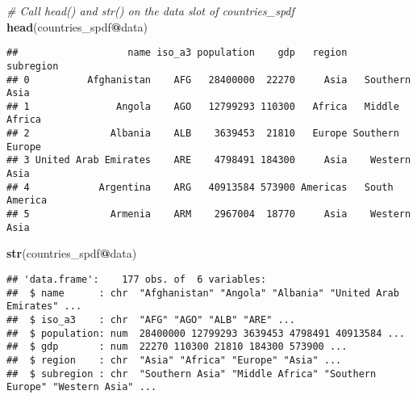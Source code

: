 \documentclass[]{article}
\newenvironment{Shaded}{\begin{snugshade}}{\end{snugshade}}
\newcommand{\CommentTok}[1]{\textcolor[rgb]{0.56,0.35,0.01}{\textit{#1}}}
\newcommand{\KeywordTok}[1]{\textcolor[rgb]{0.13,0.29,0.53}{\textbf{#1}}}
\newcommand{\NormalTok}[1]{#1}
\newcommand{\OperatorTok}[1]{\textcolor[rgb]{0.81,0.36,0.00}{\textbf{#1}}}
\begin{document}
\begin{Shaded}
\begin{Highlighting}[]
\CommentTok{# Call head() and str() on the data slot of countries_spdf}
\KeywordTok{head}\NormalTok{(countries_spdf}\OperatorTok{@}\NormalTok{data)}
\end{Highlighting}
\end{Shaded}

\begin{verbatim}
##                   name iso_a3 population    gdp   region       subregion
## 0          Afghanistan    AFG   28400000  22270     Asia   Southern Asia
## 1               Angola    AGO   12799293 110300   Africa   Middle Africa
## 2              Albania    ALB    3639453  21810   Europe Southern Europe
## 3 United Arab Emirates    ARE    4798491 184300     Asia    Western Asia
## 4            Argentina    ARG   40913584 573900 Americas   South America
## 5              Armenia    ARM    2967004  18770     Asia    Western Asia
\end{verbatim}

\begin{Shaded}
\begin{Highlighting}[]
\KeywordTok{str}\NormalTok{(countries_spdf}\OperatorTok{@}\NormalTok{data)}
\end{Highlighting}
\end{Shaded}

\begin{verbatim}
## 'data.frame':    177 obs. of  6 variables:
##  $ name      : chr  "Afghanistan" "Angola" "Albania" "United Arab Emirates" ...
##  $ iso_a3    : chr  "AFG" "AGO" "ALB" "ARE" ...
##  $ population: num  28400000 12799293 3639453 4798491 40913584 ...
##  $ gdp       : num  22270 110300 21810 184300 573900 ...
##  $ region    : chr  "Asia" "Africa" "Europe" "Asia" ...
##  $ subregion : chr  "Southern Asia" "Middle Africa" "Southern Europe" "Western Asia" ...
\end{verbatim}

\begin{Shaded}
\end{Shaded}
\end{document}
